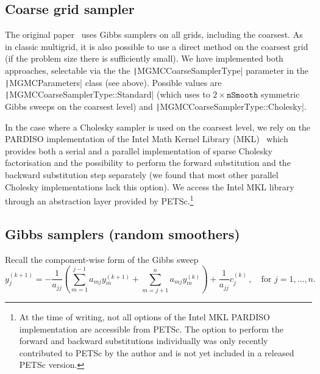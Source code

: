 \documentclass[
fontsize=11pt,
paper=a4,
numbers=noenddot
]{scrartcl}
\begin{document}
\subsection{Coarse grid sampler}
The original paper~\cite{goodmansokal} uses Gibbs samplers on all grids, including the coarsest. As in classic multigrid, it is also possible to use a direct method on the coarsest grid (if the problem size there is sufficiently small). We have implemented both approaches, selectable via the the \texttt|MGMCCoarseSamplerType| parameter in the \texttt|MGMCParameters| class (see above). Possible values are \texttt|MGMCCoarseSamplerType::Standard| (which uses to $2 \times \texttt{nSmooth}$ symmetric Gibbs sweeps on the coarsest level) and \texttt|MGMCCoarseSamplerType::Cholesky|.

 In the case where a Cholesky sampler is used on the coarsest level, we rely on the PARDISO implementation of the Intel Math Kernel Library (MKL)~\cite{intelmkl} which provides both a serial and a parallel implementation of sparse Cholesky factorisation and the possibility to perform the forward substitution and the backward substitution step separately (we found that most other parallel Cholesky implementations lack this option). We access the Intel MKL library through an abstraction layer provided by PETSc.\footnote{At the time of writing, not all options of the Intel MKL PARDISO implementation are accessible from PETSc. The option to perform the forward and backward substitutions individually was only recently contributed to PETSc by the author and is not yet included in a released PETSc version.} 

\subsection{Gibbs samplers (random smoothers)}
Recall the component-wise form of the Gibbs sweep
\begin{equation}
    y^{(k+1)}_j = - \frac{1}{a_{jj}} \left(
        \sum_{m=1}^{j-1} a_{mj} y^{(k+1)}_m + \sum_{m=j+1}^n a_{mj} y^{(k)}_m
      \right) + \frac{1}{a_{jj}} c^{(k)}_j \,,\quad \text{for $j=1,\dotsc,n$.}
      \label{eq:gibbs_comp2}
\end{equation}
\end{document}
